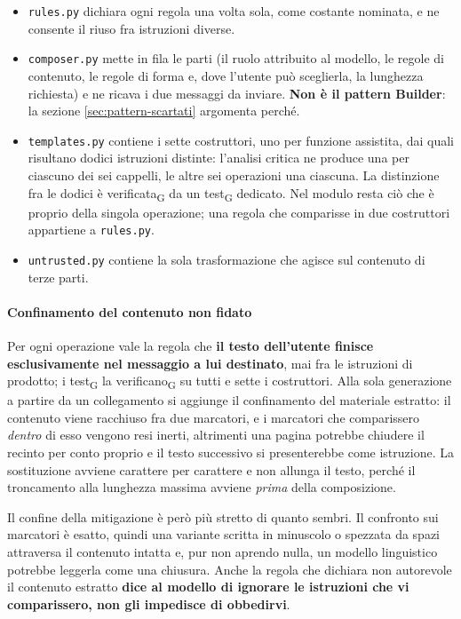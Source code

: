 \documentclass[a4paper, 10pt]{article}
\begin{document}
\begin{itemize}
    \setlength{\itemsep}{3pt}
    \item \texttt{rules.py} dichiara ogni regola una volta sola, come costante nominata, e ne consente il riuso fra istruzioni diverse.

    \item \texttt{composer.py} mette in fila le parti (il ruolo attribuito al modello, le regole di contenuto, le regole di forma e, dove l'utente può sceglierla, la lunghezza richiesta) e ne ricava i due messaggi da inviare. \textbf{Non è il pattern Builder}: la sezione \ref{sec:pattern-scartati} argomenta perché.

    \item \texttt{templates.py} contiene i sette costruttori, uno per funzione assistita, dai quali risultano dodici istruzioni distinte: l'analisi critica ne produce una per ciascuno dei sei cappelli, le altre sei operazioni una ciascuna. La distinzione fra le dodici è verificata\textsubscript{G} da un test\textsubscript{G} dedicato. Nel modulo resta ciò che è proprio della singola operazione; una regola che comparisse in due costruttori appartiene a \texttt{rules.py}.

    \item \texttt{untrusted.py} contiene la sola trasformazione che agisce sul contenuto di terze parti.
\end{itemize}

\paragraph{Confinamento del contenuto non fidato}
Per ogni operazione vale la regola che \textbf{il testo dell'utente finisce esclusivamente nel messaggio a lui destinato}, mai fra le istruzioni di prodotto; i test\textsubscript{G} la verificano\textsubscript{G} su tutti e sette i costruttori. Alla sola generazione a partire da un collegamento si aggiunge il confinamento del materiale estratto: il contenuto viene racchiuso fra due marcatori, e i marcatori che comparissero \textit{dentro} di esso vengono resi inerti, altrimenti una pagina potrebbe chiudere il recinto per conto proprio e il testo successivo si presenterebbe come istruzione. La sostituzione avviene carattere per carattere e non allunga il testo, perché il troncamento alla lunghezza massima avviene \textit{prima} della composizione.

Il confine della mitigazione è però più stretto di quanto sembri. Il confronto sui marcatori è esatto, quindi una variante scritta in minuscolo o spezzata da spazi attraversa il contenuto intatta e, pur non aprendo nulla, un modello linguistico potrebbe leggerla come una chiusura. Anche la regola che dichiara non autorevole il contenuto estratto \textbf{dice al modello di ignorare le istruzioni che vi comparissero, non gli impedisce di obbedirvi}.
\end{document}
